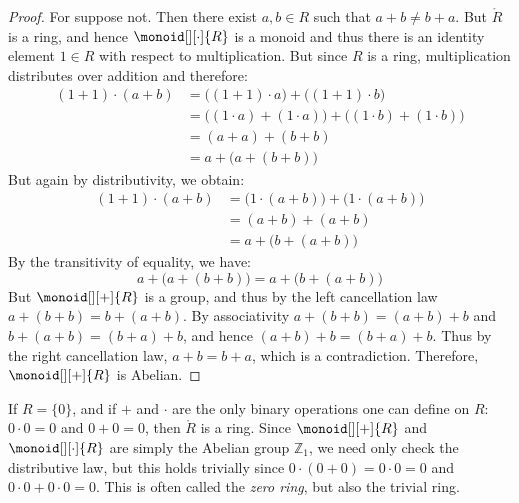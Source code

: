     \begin{proof}
        For suppose not. Then there exist $a,b\in{R}$ such that
        $a+b\ne{b}+a$. But $\ring{R}$ is a ring, and hence
        $\monoid[][\cdot]{R}$ is a monoid and thus there is an identity
        element $1\in{R}$ with respect to multiplication. But since $R$ is a
        ring, multiplication distributes over addition and therefore:
        \begin{align}
            (1+1)\cdot(a+b)
                &=\big((1+1)\cdot{a}\big)+\big((1+1)\cdot{b}\big)
                \tag{Left Distributive Law}\\
                &=\big((1\cdot{a})+(1\cdot{a})\big)+
                    \big((1\cdot{b})+(1\cdot{b})\big)
                \tag{Right Distributive Law}\\
                &=(a+a)+(b+b)
                    \tag{Multiplicative Identity}\\
                &=a+\big(a+(b+b)\big)
                    \tag{Associative Law}
        \end{align}
        But again by distributivity, we obtain:
        \begin{align}
            (1+1)\cdot(a+b)
            &=\big(1\cdot(a+b)\big)+\big(1\cdot(a+b)\big)
            \tag{Right Distributive Law}\\
            &=(a+b)+(a+b)
                \tag{Multiplicative Identity}\\
            &=a+\big(b+(a+b)\big)
                \tag{Associative Law}
        \end{align}
        By the transitivity of equality, we have:
        \begin{equation}
            a+\big(a+(b+b)\big)=a+\big(b+(a+b)\big)
        \end{equation}
        But $\monoid[][+]{R}$ is a group, and thus by the left cancellation
        law $a+(b+b)=b+(a+b)$. By associativity $a+(b+b)=(a+b)+b$ and
        $b+(a+b)=(b+a)+b$, and hence $(a+b)+b=(b+a)+b$. Thus by the right
        cancellation law, $a+b=b+a$, which is a contradiction. Therefore,
        $\monoid[][+]{R}$ is Abelian.
    \end{proof}
    \begin{example}
        If $R=\{0\}$, and if $+$ and $\cdot$ are the only binary operations
        one can define on $R$: $0\cdot{0}=0$ and $0+0=0$, then
        $\ring{R}$ is a ring. Since $\monoid[][+]{R}$ and
        $\monoid[][\cdot]{R}$ are simply the Abelian group $\mathbb{Z}_{1}$,
        we need only check the distributive law, but this holds trivially
        since $0\cdot(0+0)=0\cdot{0}=0$ and $0\cdot{0}+0\cdot{0}=0$. This is
        often called the \textit{zero ring}, but also the trivial ring.
    \end{example}
